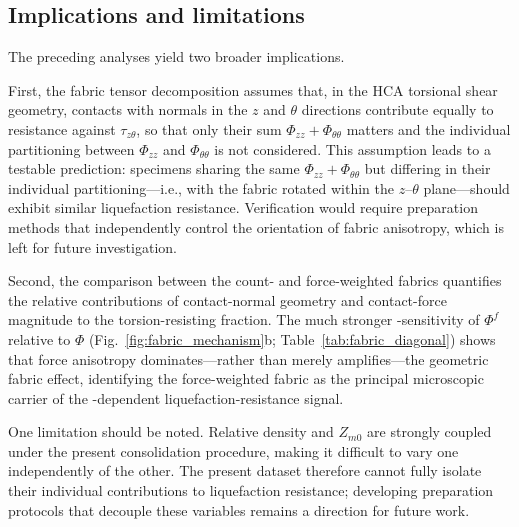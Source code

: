 \subsection{Implications and limitations}
\label{subsec:limitations}

The preceding analyses yield two broader implications.

First, the fabric tensor decomposition assumes that, in the HCA torsional shear geometry, contacts with normals in the $z$ and $\theta$ directions contribute equally to resistance against $\tau_{z\theta}$, so that only their sum $\Phi_{zz} + \Phi_{\theta\theta}$ matters and the individual partitioning between $\Phi_{zz}$ and $\Phi_{\theta\theta}$ is not considered. This assumption leads to a testable prediction: specimens sharing the same $\Phi_{zz} + \Phi_{\theta\theta}$ but differing in their individual partitioning---i.e., with the fabric rotated within the $z$--$\theta$ plane---should exhibit similar liquefaction resistance. Verification would require preparation methods that independently control the orientation of fabric anisotropy, which is left for future investigation.

Second, the comparison between the count- and force-weighted fabrics quantifies the relative contributions of contact-normal geometry and contact-force magnitude to the torsion-resisting fraction. The much stronger \Kzero{}-sensitivity of $\Phi^f$ relative to $\Phi$ (Fig.~\ref{fig:fabric_mechanism}b; Table~\ref{tab:fabric_diagonal}) shows that force anisotropy dominates---rather than merely amplifies---the geometric fabric effect, identifying the force-weighted fabric as the principal microscopic carrier of the \Kzero{}-dependent liquefaction-resistance signal.

One limitation should be noted. Relative density and $Z_{m0}$ are strongly coupled under the present consolidation procedure, making it difficult to vary one independently of the other. The present dataset therefore cannot fully isolate their individual contributions to liquefaction resistance; developing preparation protocols that decouple these variables remains a direction for future work.
